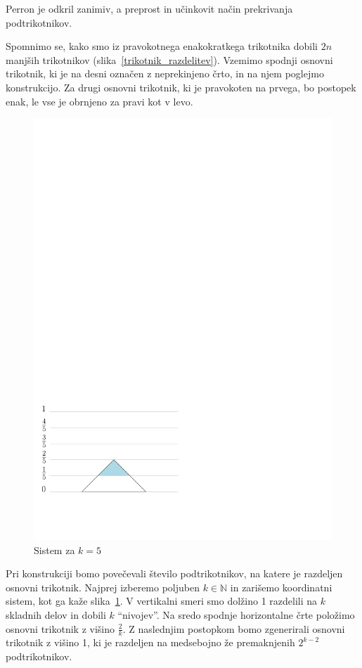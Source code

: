 \documentclass[a4paper, 12pt]{article}
\begin{document}
Perron je odkril zanimiv, a preprost in učinkovit način prekrivanja podtrikotnikov.

Spomnimo se, kako smo iz pravokotnega enakokratkega trikotnika dobili $ 2n $ manjših trikotnikov (slika~\ref{trikotnik_razdelitev}). Vzemimo spodnji osnovni trikotnik, ki je na desni označen z neprekinjeno črto, in na njem poglejmo konstrukcijo. Za drugi osnovni trikotnik, ki je pravokoten na prvega, bo postopek enak, le vse je obrnjeno za pravi kot v levo.

\begin{figure}
    \includegraphics[width=0.9\linewidth]{ipe_slike/k_5.pdf}
    \caption{Sistem za $ k = 5 $}
    \label{sistem5}
\end{figure}

Pri konstrukciji bomo povečevali število podtrikotnikov, na katere je razdeljen osnovni trikotnik. Najprej izberemo poljuben $ k \in \mathbb{N} $ in zarišemo koordinatni sistem, kot ga kaže slika~\ref{sistem5}. V vertikalni smeri smo dolžino 1 razdelili na $ k $ skladnih delov in dobili $ k $ ``nivojev''. Na sredo spodnje horizontalne črte položimo osnovni trikotnik z višino $ \frac{2}{k} $. Z naslednjim postopkom bomo zgenerirali osnovni trikotnik z višino 1, ki je razdeljen na medsebojno že premaknjenih $ 2^{k-2} $ podtrikotnikov.
\end{document}
